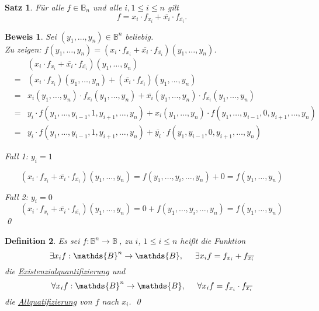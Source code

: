\documentclass[ngerman]{scrartcl}
\theoremstyle{custom}
\newtheorem{mdef}{Definition} \numberwithin{mdef}{subsection}
\newtheorem{ms}[mdef]{Satz}
\newtheorem*{bw}{Beweis}
\newcommand{\0}{\mathbf{0}}
\newcommand{\1}{\mathbf{L}}
\newcommand{\bol}{\mathds{B}^n \rightarrow \mathds{B}}
\newcommand{\bolf}{$f: \bol~$}
\begin{document}
\begin{ms}
F\"ur alle $f \in \mathds{B}_n$ und alle $i, 1 \leq i \leq n$ gilt
\begin{equation*}
f = x_i \cdot f_{x_i} + \overline{x_i} \cdot f_{\overline{x_i}}.
\end{equation*}
\end{ms}

\begin{bw}
Sei $(y_1, \dots, y_n) \in \mathds{B}^n$ beliebig.\\
Zu zeigen: $f(y_1, \dots, y_n) = (x_i \cdot f_{x_i} + \overline{x_i}
\cdot f_{\overline{x_i}})(y_1, \dots, y_n)$.
\begin{eqnarray*}
&&(x_i \cdot f_{x_i} + \overline{x_i} \cdot f_{\overline{x_i}})(y_1,
\dots, y_n)\\
&=& (x_i \cdot f_{x_i})(y_1, \dots,
y_n)+(\overline{x_i} \cdot f_{\overline{x_i}})(y_1, \dots, y_n)\\
&=& x_i(y_1, \dots, y_n) \cdot f_{x_i}(y_1, \dots, y_n) +
\overline{x_i}(y_1, \dots, y_n) \cdot f_{\overline{x_i}}(y_1, \dots,
y_n)\\
&=& y_i \cdot f(y_1, \dots, y_{i-1}, 1, y_{i+1}, \dots, y_n) +
x_i(y_1, \dots, y_n) \cdot f(y_1, \dots, y_{i-1}, 0, y_{i+1}, \dots,
y_n) \\
&=& y_i \cdot f(y_1, \dots, y_{i-1}, 1, y_{i+1}, \dots,y_n) +
\overline{y_i} \cdot f(y_1, y_{i-1}, 0, y_{i+1}, \dots, y_n) 
\end{eqnarray*}

Fall 1: $y_i = 1$

\begin{equation*}
(x_i \cdot f_{x_i} + \overline{x_i} \cdot
f_{\overline{x_i}})(y_1,\dots, y_n) = f(y_1,\dots, y_i, \dots, y_n) +
0 = f(y_1, \dots, y_n)
\end{equation*}

Fall 2: $y_i = 0$
\begin{equation*}
(x_i \cdot f_{x_i} + \overline{x_i} \cdot
f_{\overline{x_i}})(y_1,\dots, y_n) = 0+ f(y_1,\dots, y_i, \dots, y_n) = f(y_1, \dots, y_n)
\end{equation*}
\qed
\end{bw}

\begin{mdef}
Es sei \bolf, zu $i$, $1 \leq i \leq n$ hei\ss t die Funktion 
\begin{equation*}
\exists x_i f: \mathds{B}^n \rightarrow \mathds{B}, \hspace{0.5cm}
\exists x_i f= f_{x_i} + f_{\overline{x_i}}
\end{equation*}
die \underline{Existenzialquantifizierung} und 
\begin{equation*}
\forall x_i f: \mathds{B}^n \rightarrow \mathds{B}, \hspace{0.5cm}
\forall x_i f= f_{x_i} \cdot f_{\overline{x_i}}
\end{equation*}
die \underline{Allquatifizierung} von $f$ nach $x_i$.
\qed
\end{mdef}
\end{document}
